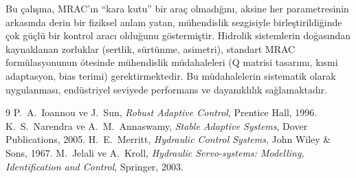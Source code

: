 \documentclass[12pt,a4paper]{article}
\begin{document}
\begin{kavram}
Bu çalışma, MRAC'ın ``kara kutu'' bir araç olmadığını, aksine her parametresinin arkasında derin bir fiziksel anlam yatan, mühendislik sezgisiyle birleştirildiğinde çok güçlü bir kontrol aracı olduğunu göstermiştir. Hidrolik sistemlerin doğasından kaynaklanan zorluklar (sertlik, sürtünme, asimetri), standart MRAC formülasyonunun ötesinde mühendislik müdahaleleri (Q matrisi tasarımı, kısmi adaptasyon, bias terimi) gerektirmektedir. Bu müdahalelerin sistematik olarak uygulanması, endüstriyel seviyede performans ve dayanıklılık sağlamaktadır.
\end{kavram}

\begin{thebibliography}{9}
 P.~A.~Ioannou ve J.~Sun, \textit{Robust Adaptive Control}, Prentice Hall, 1996.
 K.~S.~Narendra ve A.~M.~Annaswamy, \textit{Stable Adaptive Systems}, Dover Publications, 2005.
 H.~E.~Merritt, \textit{Hydraulic Control Systems}, John Wiley \& Sons, 1967.
 M.~Jelali ve A.~Kroll, \textit{Hydraulic Servo-systems: Modelling, Identification and Control}, Springer, 2003.
\end{thebibliography}
\end{document}
